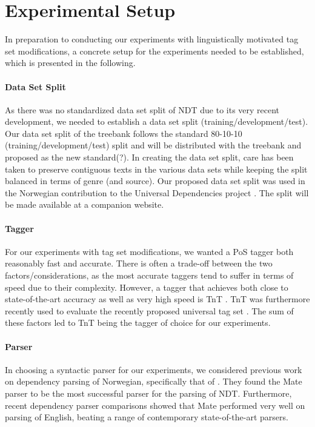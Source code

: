 \documentclass[11pt,a4paper]{article}
\begin{document}
\section{Experimental Setup}
\label{sec:setup}
In preparation to conducting our experiments with linguistically motivated tag
set modifications, a concrete setup for the experiments needed to be
established, which is presented in the following.

\paragraph{Data Set Split}
As there was no standardized data set split of NDT due to its very recent
development, we needed to establish a data set split
(training/development/test). Our data set split of the treebank follows the
standard 80-10-10 (training/development/test) split and will be distributed
with the treebank and proposed as the new standard(?). In creating the data set
split, care has been taken to preserve contiguous texts in the various data
sets while keeping the split balanced in terms of genre (and source). Our
proposed data set split was used in the Norwegian contribution to the Universal
Dependencies project \cite{Ovr:Hoh:16}.  The split will be made available at a
companion website.

\paragraph{Tagger}
For our experiments with tag set modifications, we wanted a PoS tagger both
reasonably fast and accurate. There is often a trade-off between the two
factors/considerations, as the most accurate taggers tend to suffer in terms of
speed due to their complexity. However, a tagger that achieves both close to
state-of-the-art accuracy as well as very high speed is TnT \cite{Bra:00}. TnT was furthermore recently used to evaluate the recently proposed universal tag set
\cite{Pet:Das:McD:12}. The sum of these factors led to TnT being the tagger
of choice for our experiments.

\paragraph{Parser}
In choosing a syntactic parser for our experiments, we considered previous work
on dependency parsing of Norwegian, specifically that of \cite{Sol:Skj:Ovr:14}.
They found the Mate parser \cite{Boh:10} to be the most successful parser for
the parsing of NDT. Furthermore, recent dependency parser comparisons
\cite{Cho:Tet:Ste:15} showed that Mate performed very well on parsing of
English, beating a range of contemporary state-of-the-art parsers.
\end{document}
